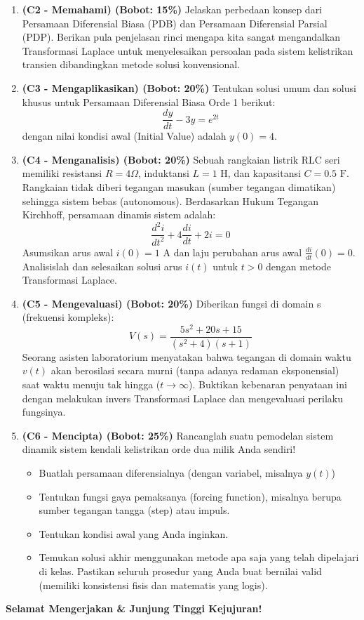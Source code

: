 \documentclass[11pt,a4paper]{article}
\begin{document}
\begin{enumerate}[label=\textbf{\arabic*.}]
    \item \textbf{(C2 - Memahami) (Bobot: 15\%)} 
    Jelaskan perbedaan konsep dari Persamaan Diferensial Biasa (PDB) dan Persamaan Diferensial Parsial (PDP). Berikan pula penjelasan rinci mengapa kita sangat mengandalkan Transformasi Laplace untuk menyelesaikan persoalan pada sistem kelistrikan transien dibandingkan metode solusi konvensional.

    \item \textbf{(C3 - Mengaplikasikan) (Bobot: 20\%)}
    Tentukan solusi umum dan solusi khusus untuk Persamaan Diferensial Biasa Orde 1 berikut:
    $$ \frac{dy}{dt} - 3y = e^{2t} $$
    dengan nilai kondisi awal (Initial Value) adalah $y(0) = 4$.

    \item \textbf{(C4 - Menganalisis) (Bobot: 20\%)}
    Sebuah rangkaian listrik RLC seri memiliki resistansi $R = 4 \Omega$, induktansi $L = 1 \text{ H}$, dan kapasitansi $C = 0.5 \text{ F}$. Rangkaian tidak diberi tegangan masukan (sumber tegangan dimatikan) sehingga sistem bebas (autonomous).
    Berdasarkan Hukum Tegangan Kirchhoff, persamaan dinamis sistem adalah:
    $$ \frac{d^2 i}{dt^2} + 4\frac{di}{dt} + 2i = 0 $$
    Asumsikan arus awal $i(0) = 1$ A dan laju perubahan arus awal $\frac{di}{dt}(0) = 0$. Analisislah dan selesaikan solusi arus $i(t)$ untuk $t > 0$ dengan metode Transformasi Laplace.

    \item \textbf{(C5 - Mengevaluasi) (Bobot: 20\%)}
    Diberikan fungsi di domain s (frekuensi kompleks):
    $$ V(s) = \frac{5s^2 + 20s + 15}{(s^2+4)(s+1)} $$
    Seorang asisten laboratorium menyatakan bahwa tegangan di domain waktu $v(t)$ akan berosilasi secara murni (tanpa adanya redaman eksponensial) saat waktu menuju tak hingga ($t \to \infty$). Buktikan kebenaran penyataan ini dengan melakukan invers Transformasi Laplace dan mengevaluasi perilaku fungsinya.

    \item \textbf{(C6 - Mencipta) (Bobot: 25\%)}
    Rancanglah suatu pemodelan sistem dinamik sistem kendali kelistrikan orde dua milik Anda sendiri! 
    \begin{itemize}
        \item Buatlah persamaan diferensialnya (dengan variabel, misalnya $y(t)$)
        \item Tentukan fungsi gaya pemaksanya (forcing function), misalnya berupa sumber tegangan tangga (step) atau impuls.
        \item Tentukan kondisi awal yang Anda inginkan.
        \item Temukan solusi akhir menggunakan metode apa saja yang telah dipelajari di kelas. Pastikan seluruh prosedur yang Anda buat bernilai valid (memiliki konsistensi fisis dan matematis yang logis).
    \end{itemize}
\end{enumerate}

\vfill
\begin{center}
\textbf{Selamat Mengerjakan \& Junjung Tinggi Kejujuran!}
\end{center}
\end{document}
